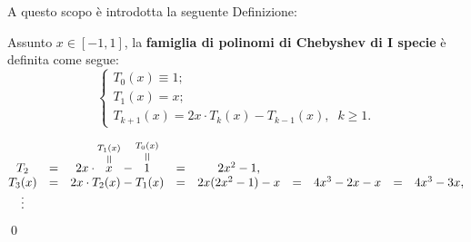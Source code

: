 
A questo scopo è introdotta la seguente Definizione:

\begin{definition}\label{th:polChebIsp}
    Assunto $x\in [-1,1]$, la \textbf{famiglia di polinomi di Chebyshev di I specie} è definita come segue:
    \begin{equation}\label{eq:polChebISp}
        \begin{cases}
        T_0(x) \equiv 1;\\
        T_1(x) = x;\\
        T_{k+1}(x) = 2x\cdot T_k(x)-T_{k-1}(x),\;\; k\geq 1.
        \end{cases}
    \end{equation}
\end{definition}

\begin{example}
    \begin{equation*}
        \begin{matrix}
            T_2 &=& 2x \cdot \equaltoup{x}{T_1(x)} - \equaltoup{1}{T_0(x)} &=& 2x^2-1,\\
            T_3(x) &=& 2x\cdot T_2(x)-T_1(x)&=&2x(2x^2-1)-x&=& 4x^3-2x-x &=& 4x^3-3x,\\
            \vdots
        \end{matrix}
    \end{equation*}
    \qed
\end{example}

